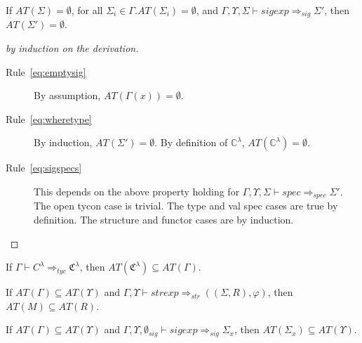 \begin{lemma}\label{lem:fullyrelativized}
If $AT(\Sigma) = \emptyset$, for all $\Sigma_i\in\Gamma.AT(\Sigma_i)=\emptyset$, and $\Gamma,\Upsilon,\Sigma\vdash sigexp \Rightarrow_{sig} \Sigma'$, then $AT(\Sigma') = \emptyset$. 
\end{lemma}
\begin{proof}[by induction on the derivation]
\begin{description}
\item[Rule~\ref{eq:emptysig}] By assumption, $AT(\Gamma(x)) = \emptyset$. 
\item[Rule~\ref{eq:wheretype}] By induction, $AT(\Sigma') = \emptyset$. By definition of $\mathbb{C}^\lambda$, $AT(\mathbb{C}^\lambda) = \emptyset$. 
\item[Rule~\ref{eq:sigspecs}] This depends on the above property holding for $\Gamma,\Upsilon,\Sigma\vdash spec \Rightarrow_{spec} \Sigma'$. The open tycon case is trivial. The type and val spec cases are true by definition. The structure and functor cases are by induction. 
\end{description}
\end{proof}

\begin{lemma}\label{lem:tyconTyc}
If $\Gamma\vdash C^\lambda \Rightarrow_{tyc} \mathfrak{C}^\lambda$, then $AT(\mathfrak{C}^\lambda) \subseteq AT(\Gamma)$. 
\end{lemma}

\begin{lemma}\label{lem:tyconElabStr}
If $AT(\Gamma) \subseteq AT(\Upsilon)$ and $\Gamma,\Upsilon\vdash strexp \Rightarrow_{str} ((\Sigma, R), \varphi)$, then $AT(M) \subseteq AT(R)$. 
\end{lemma}

\begin{lemma}\label{lem:tyconSig}
If $AT(\Gamma) \subseteq AT(\Upsilon)$ and $\Gamma,\Upsilon,\emptyset_{sig}\vdash sigexp \Rightarrow_{sig} \Sigma_x$, then $AT(\Sigma_x) \subseteq AT(\Upsilon)$. 
\end{lemma}

